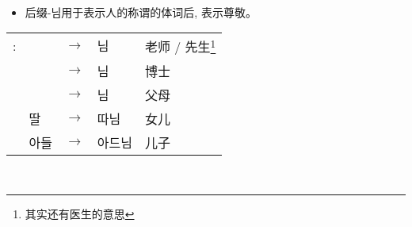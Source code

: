 \begin{grammar}
\begin{grammarsect}[\kr -(으){}시-]
\begin{tabular}{lllll}
        \end{tabular}\\
        \begin{itemize}
            \item 后缀{\kr -님}用于表示人的称谓的体词后, 表示尊敬。
        \end{itemize}
        \begin{tabular}{lllll}
            \kr \ruby{例}{예}:&\kr \ruby{先生}{선생}&$\to$&\kr  \ruby{先生}{선생}님 &老师 / 先生\footnote{其实还有医生的意思}\\
            &\kr \ruby{博士}{박사} &$\to$&\kr  \ruby{博士}{박사}님 &博士 \\
            &\kr \ruby{父母}{부모} &$\to$&\kr  \ruby{父母}{부모}님 &父母 \\
            &\kr 딸&$\to$&\kr  따님 &女儿 \\
            &\kr 아들 &$\to$&\kr  아드님 &儿子
        \end{tabular}\\
    \end{grammarsect}
\end{grammar}
